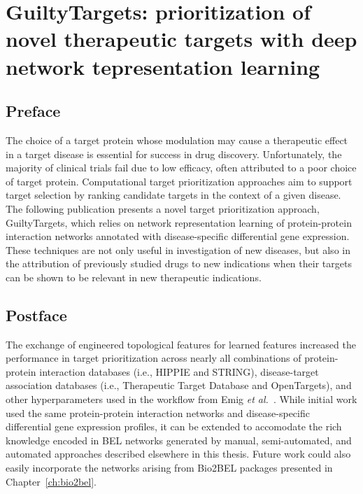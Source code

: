 \chapter{GuiltyTargets: prioritization of novel therapeutic targets with deep network tepresentation learning}
\label{ch:guiltytargets}

\section*{Preface}

The choice of a target protein whose modulation may cause a therapeutic effect in a target disease is essential for success in drug discovery.
Unfortunately, the majority of clinical trials fail due to low efficacy, often attributed to a poor choice of target protein.
Computational target prioritization approaches aim to support target selection by ranking candidate targets in the context of a given disease.
The following publication presents a novel target prioritization approach, GuiltyTargets, which relies on network representation learning of protein-protein interaction networks annotated with disease-specific differential gene expression.
These techniques are not only useful in investigation of new diseases, but also in the attribution of previously studied drugs to new indications when their targets can be shown to be relevant in new therapeutic indications.

\vspace*{\fill}



\section*{Postface}

The exchange of engineered topological features for learned features increased the performance in target prioritization across nearly all combinations of protein-protein interaction databases (i.e., HIPPIE and STRING), disease-target association databases (i.e., Therapeutic Target Database and OpenTargets), and other hyperparameters used in the workflow from Emig \textit{et al.}~\cite{Emig2013}.
While initial work used the same protein-protein interaction networks and disease-specific differential gene expression profiles, it can be extended to accomodate the rich knowledge encoded in \ac{BEL} networks generated by manual, semi-automated, and automated approaches described elsewhere in this thesis.
Future work could also easily incorporate the networks arising from Bio2BEL packages presented in Chapter~\ref{ch:bio2bel}.
